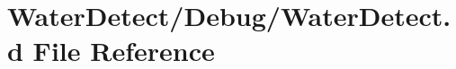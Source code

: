\hypertarget{_water_detect_8d}{}\section{Water\+Detect/\+Debug/\+Water\+Detect.d File Reference}
\label{_water_detect_8d}
